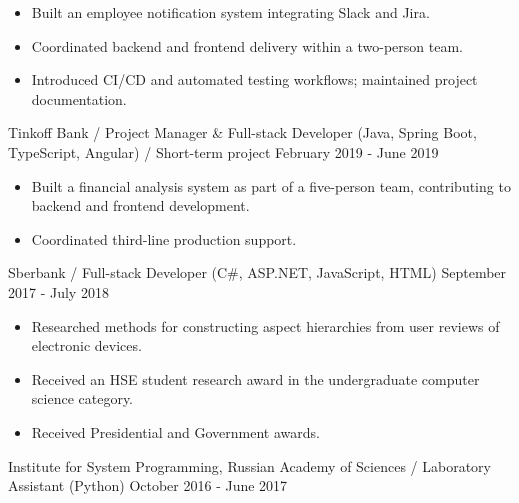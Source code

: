 \begin{cventries}
\vspace{-0.4cm}
\cventry
{
\vspace{-0.4cm}
\begin{itemize}
\item Built an employee notification system integrating Slack and Jira.
\item Coordinated backend and frontend delivery within a two-person team.
\item Introduced CI/CD and automated testing workflows; maintained project documentation.
\end{itemize}
}
{Tinkoff Bank / Project Manager \& Full-stack Developer (Java, Spring Boot, TypeScript, Angular) / Short-term project}
{}
{February 2019 - June 2019}

\vspace{-0.4cm}
\cventry
{
\vspace{-0.4cm}
\begin{itemize}
\item Built a financial analysis system as part of a five-person team, contributing to backend and frontend development.
\item Coordinated third-line production support.
\end{itemize}
}
{Sberbank / Full-stack Developer (C\#, ASP.NET, JavaScript, HTML)}
{}
{September 2017 - July 2018}

\vspace{-0.4cm}
\cventry
{
\vspace{-0.4cm}
\begin{itemize}
\item Researched methods for constructing aspect hierarchies from user reviews of electronic devices.
\item Received an HSE student research award in the undergraduate computer science category.
\item Received Presidential and Government awards.
\end{itemize}
}
{Institute for System Programming, Russian Academy of Sciences / Laboratory Assistant (Python)}
{}
{October 2016 - June 2017}

\end{cventries}
